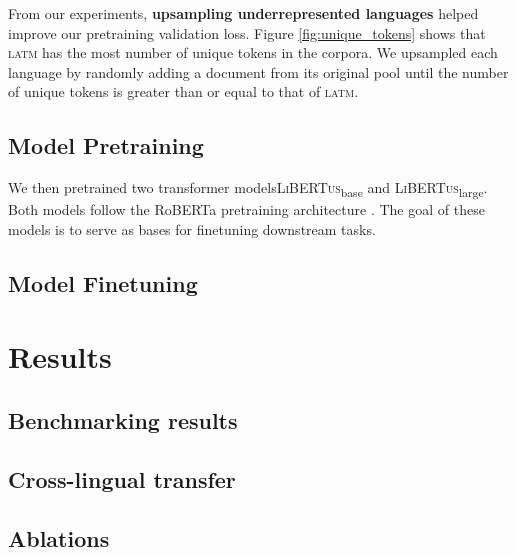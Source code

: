 \documentclass[11pt]{article}
\newcommand{\libertus}{\textsc{LiBERTus}}
\begin{document}
From our experiments, \textbf{upsampling underrepresented languages} helped improve our pretraining validation loss.
Figure \ref{fig:unique_tokens} shows that \textsc{latm} has the most number of unique tokens in the corpora.
We upsampled each language by randomly adding a document from its original pool until the number of unique tokens is greater than or equal to that of \textsc{latm}.

\subsection{Model Pretraining}

We then pretrained two transformer models\textemdash \libertus{}\textsubscript{base} and \libertus{}\textsubscript{large}.
Both models follow the RoBERTa pretraining architecture \cite{liu-etal-2019-roberta}.
The goal of these models is to serve as bases for finetuning downstream tasks.




\subsection{Model Finetuning}


\section{Results}


\subsection{Benchmarking results}


\subsection{Cross-lingual transfer}


\subsection{Ablations}





\end{document}
